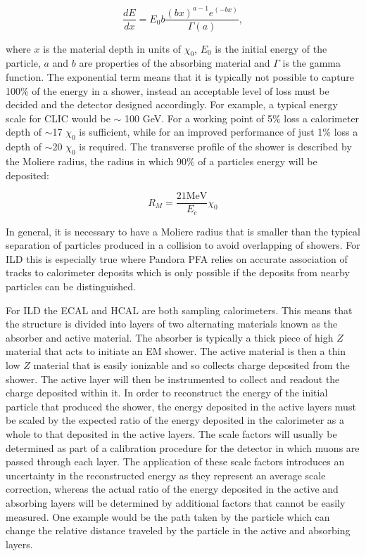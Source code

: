 \begin{equation}
  \label{bethebloch}
\frac{dE}{dx}=E_0 b \frac{(bx)^{a-1}e^{(-bx)}}{\Gamma(a)},
\end{equation}

where $x$ is the material depth in units of $\chi_0$, $E_0$ is the initial energy of the particle, $a$ and $b$ are properties of the absorbing material and $\Gamma$ is the gamma function. The exponential term means that it is typically not possible to capture 100\% of the energy in a shower, instead an acceptable level of loss must be decided and the detector designed accordingly. For example, a typical energy scale for \ac{CLIC} would be $\sim$ 100 GeV. For a working point of 5\% loss a calorimeter depth of $\sim$17 $\chi_0$ is sufficient, while for an improved performance of just 1\% loss a depth of $\sim$20 $\chi_0$ is required. The transverse profile of the shower is described by the Moliere radius, the radius in which 90\% of a particles energy will be deposited:

\begin{equation}
R_M=\frac{21\text{MeV}}{E_c}\chi_0
\end{equation}

In general, it is necessary to have a Moliere radius that is smaller than the typical separation of particles produced in a collision to avoid overlapping of showers. For \ac{ILD} this is especially true where Pandora \ac{PFA} relies on accurate association of tracks to calorimeter deposits which is only possible if the deposits from nearby particles can be distinguished.

For \ac{ILD} the \ac{ECAL} and \ac{HCAL} are both sampling calorimeters. This means that the structure is divided into layers of two alternating materials known as the absorber and active material. The absorber is typically a thick piece of high $Z$ material that acts to initiate an \ac{EM} shower. The active material is then a thin low $Z$ material that is easily ionizable and so collects charge deposited from the shower. The active layer will then be instrumented to collect and readout the charge deposited within it. In order to reconstruct the energy of the initial particle that produced the shower, the energy deposited in the active layers must be scaled by the expected ratio of the energy deposited in the calorimeter as a whole to that deposited in the active layers. The scale factors will usually be determined as part of a calibration procedure for the detector in which muons are passed through each layer. The application of these scale factors introduces an uncertainty in the reconstructed energy as they represent an average scale correction, whereas the actual ratio of the energy deposited in the active and absorbing layers will be determined by additional factors that cannot be easily measured. One example would be the path taken by the particle which can change the relative distance traveled by the particle in the active and absorbing layers.

